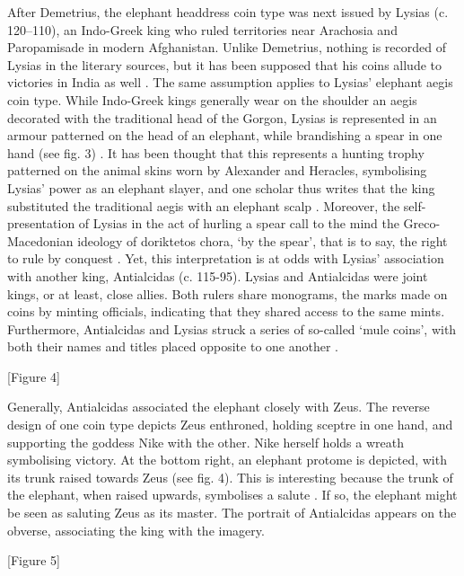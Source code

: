 \documentclass{ijsra}
\begin{document}
After Demetrius, the elephant headdress coin type was next issued by Lysias (c. 120--110\BC), an Indo-Greek king who ruled
territories near Arachosia and Paropamisade in modern Afghanistan. 
Unlike Demetrius, nothing is recorded of Lysias in the literary sources, but it has been supposed that his coins allude to
victories in India as well \parencite[107]{Widemann2003}.
The same assumption applies to Lysias’ elephant aegis coin type. 
While Indo-Greek kings generally wear on the shoulder an aegis decorated with the traditional head of the Gorgon, Lysias is
represented in an armour patterned on the head of an elephant, while brandishing a spear in one hand (see fig. 3) \parencite[71]{Whitehead1970}. 
It has been thought that this represents a hunting trophy patterned on the animal skins worn by Alexander and Heracles,
symbolising Lysias’ power as an elephant slayer, and one scholar thus writes that the king substituted the traditional aegis with
an elephant scalp \parencite[341]{Cribb2011}. 
Moreover, the self-presentation of Lysias in the act of hurling a spear call to the mind the Greco-Macedonian ideology of
doriktetos chora, ‘by the spear’, that is to say, the right to rule by conquest \parencite[27]{Billows1995}. 
Yet, this interpretation is at odds with Lysias’ association with another king, Antialcidas (c. 115-95\BC). 
Lysias and Antialcidas were joint kings, or at least, close allies. 
Both rulers share monograms, the marks made on coins by minting officials, indicating that they shared access to the same mints. 
Furthermore, Antialcidas and Lysias struck a series of so-called ‘mule coins’, with both their names and titles placed opposite to
one another \parencite[121]{Mairs2014}.

[Figure 4]

Generally, Antialcidas associated the elephant closely with Zeus. The reverse design of one coin type depicts Zeus enthroned,
holding sceptre in one hand, and supporting the goddess Nike with the other.
Nike herself holds a wreath symbolising victory.
At the bottom right, an elephant protome is depicted, with its trunk raised towards Zeus (see fig. 4).
This is interesting because the trunk of the elephant, when raised upwards, symbolises a salute \parencite[33--34]{Whitehead1970}.
If so, the elephant might be seen as saluting Zeus as its master.
The portrait of Antialcidas appears on the obverse, associating the king with the imagery. 

[Figure 5]
\end{document}
